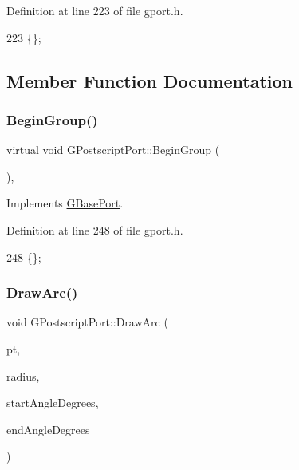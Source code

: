 Definition at line 223 of file gport.\+h.


\begin{DoxyCode}
223 \{\};
\end{DoxyCode}


\subsection{Member Function Documentation}
\mbox{\label{class_g_postscript_port_a3efa413a70790ed3e09e9f26c9aa6b2d}} 
\subsubsection{\texorpdfstring{Begin\+Group()}{BeginGroup()}}
{\footnotesize\ttfamily virtual void G\+Postscript\+Port\+::\+Begin\+Group (\begin{DoxyParamCaption}{ }\end{DoxyParamCaption})\hspace{0.3cm}{\ttfamily [inline]}, {\ttfamily [virtual]}}



Implements \mbox{\hyperlink{class_g_base_port_ac7aafbb728fe8b61dec2c3f163e2c894}{G\+Base\+Port}}.



Definition at line 248 of file gport.\+h.


\begin{DoxyCode}
248 \{\};
\end{DoxyCode}
\mbox{\label{class_g_postscript_port_a9930f5d5cf8d6efb04af048a3ab72a3f}} 
\subsubsection{\texorpdfstring{Draw\+Arc()}{DrawArc()}}
{\footnotesize\ttfamily void G\+Postscript\+Port\+::\+Draw\+Arc (\begin{DoxyParamCaption}\item[{const \mbox{\hyperlink{class_g_point}{G\+Point}} \&}]{pt,  }\item[{const int}]{radius,  }\item[{const double}]{start\+Angle\+Degrees,  }\item[{const double}]{end\+Angle\+Degrees }\end{DoxyParamCaption})\hspace{0.3cm}{\ttfamily [virtual]}}



